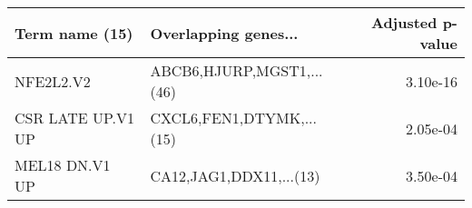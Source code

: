 \begin{tabular}{llr}
\toprule
   Term name (15) &      Overlapping genes... &  Adjusted p-value \\
\midrule
        NFE2L2.V2 & ABCB6,HJURP,MGST1,...(46) &          3.10e-16 \\
CSR LATE UP.V1 UP &  CXCL6,FEN1,DTYMK,...(15) &          2.05e-04 \\
   MEL18 DN.V1 UP &   CA12,JAG1,DDX11,...(13) &          3.50e-04 \\
\bottomrule
\end{tabular}
